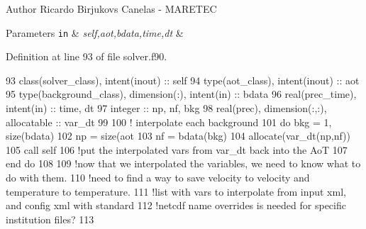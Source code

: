 \begin{DoxyAuthor}{Author}
Ricardo Birjukovs Canelas -\/ M\+A\+R\+E\+T\+EC 
\end{DoxyAuthor}

\begin{DoxyParams}[1]{Parameters}
\mbox{\tt in}  & {\em self,aot,bdata,time,dt} & \\
\hline
\end{DoxyParams}


Definition at line 93 of file solver.\+f90.


\begin{DoxyCode}
93     \textcolor{keywordtype}{class}(solver\_class), \textcolor{keywordtype}{intent(inout)} :: self
94     \textcolor{keywordtype}{type}(aot\_class), \textcolor{keywordtype}{intent(inout)} :: aot
95     \textcolor{keywordtype}{type}(background\_class), \textcolor{keywordtype}{dimension(:)}, \textcolor{keywordtype}{intent(in)} :: bdata
96     \textcolor{keywordtype}{real(prec\_time)}, \textcolor{keywordtype}{intent(in)} :: time, dt
97     \textcolor{keywordtype}{integer} :: np, nf, bkg
98     \textcolor{keywordtype}{real(prec)}, \textcolor{keywordtype}{dimension(:,:)}, \textcolor{keywordtype}{allocatable} :: var\_dt
99 
100     \textcolor{comment}{! interpolate each background}
101     \textcolor{keywordflow}{do} bkg = 1, \textcolor{keyword}{size}(bdata)
102         np = \textcolor{keyword}{size}(aot%
103         nf = bdata(bkg)%
104         \textcolor{keyword}{allocate}(var\_dt(np,nf))
105         \textcolor{keyword}{call }self%
106         \textcolor{comment}{!put the interpolated vars from var\_dt back into the AoT}
107 \textcolor{keywordflow}{    end do}
108 
109     \textcolor{comment}{!now that we interpolated the variables, we need to know what to do with them.}
110     \textcolor{comment}{!need to find a way to save velocity to velocity and temperature to temperature.}
111     \textcolor{comment}{!list with vars to interpolate from input xml, and config xml with standard}
112     \textcolor{comment}{!netcdf name overrides is needed for specific institution files?}
113 
\end{DoxyCode}
